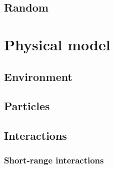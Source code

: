 \documentclass[a4paper, 12pt]{article}
\def\buildMode{buildmissing}
\begin{document}
        \subsection{Random}
        \begin{figure}[htb]
            \centering
            
            \caption{}
        \end{figure}
        \clearpage

    \section{Physical model}

        \subsection{Environment}

        \begin{figure}[htb]
            \centering
            
            \caption{}
        \end{figure}
        \clearpage

        \subsection{Particles}

        \begin{figure}[htb]
            \centering
            
            \caption{}
        \end{figure}
        \clearpage

        \subsection{Interactions}

            \subsubsection{Short-range interactions}
            \begin{figure}[htb]
                \centering
                
                \caption{}
            \end{figure}
            \clearpage
\end{document}
